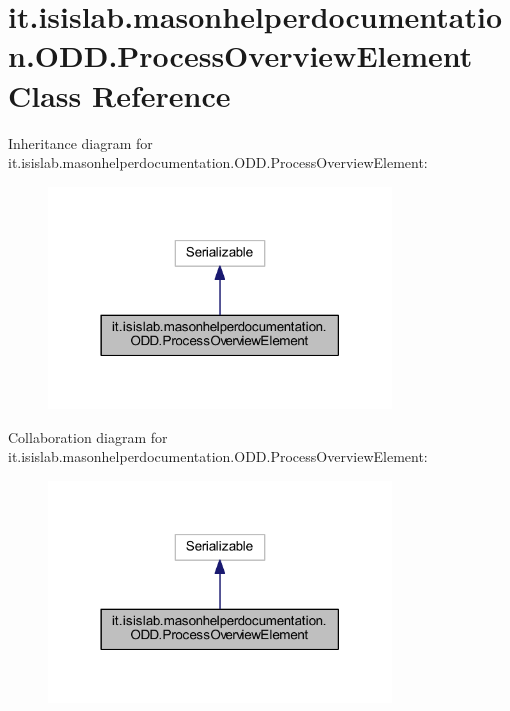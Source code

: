 \hypertarget{classit_1_1isislab_1_1masonhelperdocumentation_1_1_o_d_d_1_1_process_overview_element}{\section{it.\-isislab.\-masonhelperdocumentation.\-O\-D\-D.\-Process\-Overview\-Element Class Reference}
\label{classit_1_1isislab_1_1masonhelperdocumentation_1_1_o_d_d_1_1_process_overview_element}
}


Inheritance diagram for it.\-isislab.\-masonhelperdocumentation.\-O\-D\-D.\-Process\-Overview\-Element\-:\nopagebreak
\begin{figure}[H]
\begin{center}
\leavevmode
\includegraphics[width=258pt]{classit_1_1isislab_1_1masonhelperdocumentation_1_1_o_d_d_1_1_process_overview_element__inherit__graph}
\end{center}
\end{figure}


Collaboration diagram for it.\-isislab.\-masonhelperdocumentation.\-O\-D\-D.\-Process\-Overview\-Element\-:\nopagebreak
\begin{figure}[H]
\begin{center}
\leavevmode
\includegraphics[width=258pt]{classit_1_1isislab_1_1masonhelperdocumentation_1_1_o_d_d_1_1_process_overview_element__coll__graph}
\end{center}
\end{figure}
